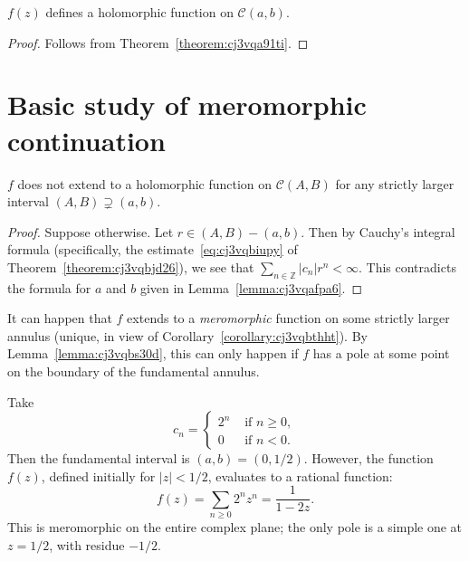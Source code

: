 \documentclass[reqno]{amsart} 
\begin{document}
\begin{lemma}
  $f(z)$ defines a holomorphic function on $\mathcal{C}(a,b)$.
\end{lemma}
\begin{proof}
  Follows from Theorem~\ref{theorem:cj3vqa91ti}.
\end{proof}

\section{Basic study of meromorphic continuation}

\begin{lemma}\label{lemma:cj3vqbs30d}
  $f$ does not extend to a holomorphic function on $\mathcal{C}(A,B)$ for any strictly larger interval $(A,B) \supsetneq (a,b)$.
\end{lemma}
\begin{proof}
  Suppose otherwise.  Let $r \in (A,B) - (a,b)$.  Then by Cauchy's integral formula (specifically, the estimate~\eqref{eq:cj3vqbiupy} of Theorem~\ref{theorem:cj3vqbjd26}), we see that $\sum_{n \in \mathbb{Z}} \lvert c_n \rvert r^n < \infty$.  This contradicts the formula for $a$ and $b$ given in Lemma~\ref{lemma:cj3vqafpa6}.
\end{proof}

\begin{note}
  It can happen that $f$ extends to a \emph{meromorphic} function on some strictly larger annulus (unique, in view of Corollary~\ref{corollary:cj3vqbthht}).  By Lemma~\ref{lemma:cj3vqbs30d}, this can only happen if $f$ has a pole at some point on the boundary of the fundamental annulus.
\end{note}

\begin{example}
  Take
  \begin{equation*}
    c_n =
    \begin{cases}
      2^n & \text{ if } n \geq 0, \\
      0 & \text{ if } n < 0.
    \end{cases}
  \end{equation*}
  Then the fundamental interval is $(a, b) = (0, 1/2)$.  However, the function $f(z)$, defined initially for $\lvert z \rvert < 1/2$, evaluates to a rational function:
  \begin{equation*}
    f(z) = \sum_{n \geq 0} 2^n z^n
    = \frac{1}{1 - 2 z}.
  \end{equation*}
  This is meromorphic on the entire complex plane; the only pole is a simple one at $z = 1/2$, with residue $-1/2$.
\end{example}
\end{document}
